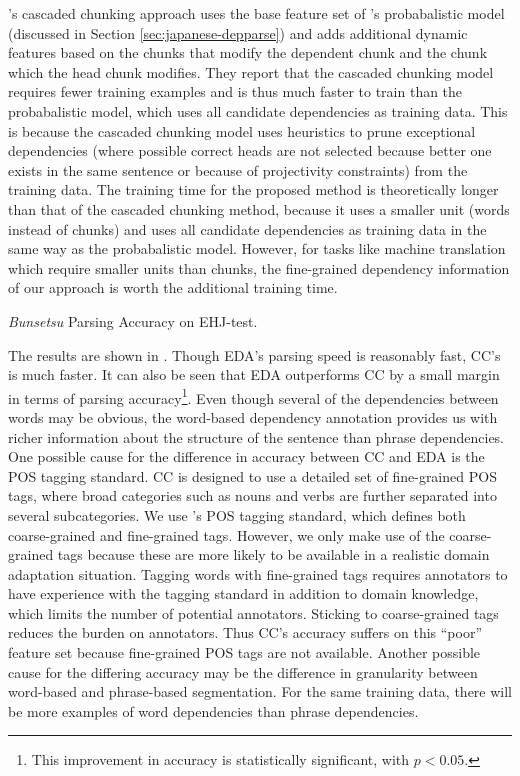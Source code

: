 \documentclass[english]{jnlp_1.4}
\def\tabref#1{}
\begin{document}
's cascaded chunking approach uses the base feature
set of 's probabalistic model (discussed in Section
\ref{sec:japanese-depparse}) and adds additional dynamic features
based on the chunks that modify the dependent chunk and the chunk
which the head chunk modifies. They report that the cascaded chunking
model requires fewer training examples and is thus much faster to
train than the probabalistic model, which uses all candidate
dependencies as training data. This is because the cascaded chunking
model uses heuristics to prune exceptional dependencies (where
possible correct heads are not selected because better one exists in
the same sentence or because of projectivity constraints) from the
training data. The training time for the proposed method is
theoretically longer than that of the cascaded chunking method,
because it uses a smaller unit (words instead of chunks) and uses all
candidate dependencies as training data in the same way as the
probabalistic model. However, for tasks like machine translation which
require smaller units than chunks, the fine-grained dependency
information of our approach is worth the additional training time.

\begin{table}[b]
  \caption{\emph{Bunsetsu} Parsing Accuracy on EHJ-test.}
  \label{table:cabocha_comparison}

\end{table}

The results are shown in \tabref{table:cabocha_comparison}. Though
EDA's parsing speed is reasonably fast, CC's is much faster. It can
also be seen that EDA outperforms CC by a small margin in terms of
parsing accuracy\footnote{This improvement in accuracy is
statistically significant, with $p < 0.05$.}. Even though several of
the dependencies between words may be obvious, the word-based
dependency annotation provides us with richer information about the
structure of the sentence than phrase dependencies. One possible cause
for the difference in accuracy between CC and EDA is the POS tagging
standard. CC is designed to use a detailed set of fine-grained POS
tags, where broad categories such as nouns and verbs are further
separated into several subcategories. We use 's
POS tagging standard, which defines both coarse-grained and
fine-grained tags. However, we only make use of the coarse-grained
tags because these are more likely to be available in a realistic
domain adaptation situation. Tagging words with fine-grained tags
requires annotators to have experience with the tagging standard in
addition to domain knowledge, which limits the number of potential
annotators. Sticking to coarse-grained tags reduces the burden on
annotators. Thus CC's accuracy suffers on this ``poor'' feature set
because fine-grained POS tags are not available. Another possible
cause for the differing accuracy may be the difference in granularity
between word-based and phrase-based segmentation. For the same
training data, there will be more examples of word dependencies than
phrase dependencies.
\end{document}
